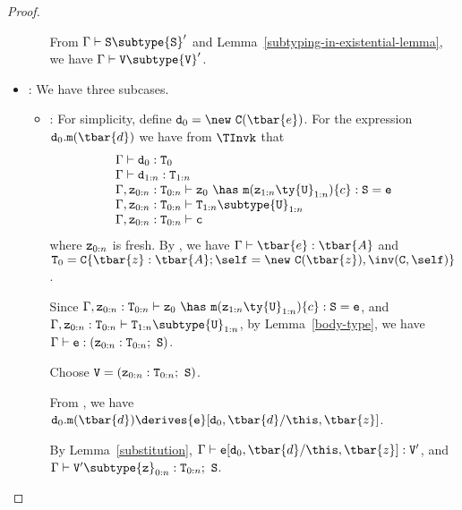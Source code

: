 \begin{proof}
\begin{itemize}
\begin{itemize}
{             From $\Gamma \vdash {\tt S} \subtype {\tt S}'$ and 
             Lemma~\ref{subtyping-in-existential-lemma}, we have $\Gamma \vdash {\tt V} \subtype {\tt V}'$.
             }
   \end{itemize}
\item
\TInvk: We have three subcases.
   \begin{itemize}
   \item
   \RInvk:  
            For simplicity, define ${\tt d}_0 = \new\ {\tt C}(\tbar{e})$.
            For the expression 
            ${\tt d}_0.{\tt m}(\tbar{d})$
            we have from $\TInvk$ that
            $$
            \begin{array}{l}
            \Gamma \vdash {\tt d}_0: {\tt T}_0 \\
            \Gamma \vdash {\tt d}_{1:n}: {\tt T}_{1:n} \\
            \Gamma, {\tt z}_{0:n}: {\tt T}_{0:n} \vdash
                {\tt z}_0\ \has\ {\tt m}({\tt z}_{1:n} \ty {\tt U}_{1:n})\{c\}: {\tt S} = {\tt e} \\
            \Gamma, {\tt z}_{0:n}: {\tt T}_{0:n} \vdash
                {\tt T}_{1:n} \subtype {\tt U}_{1:n} \\
            \Gamma, {\tt z}_{0:n}: {\tt T}_{0:n} \vdash
                {\tt c} \\
            \end{array}
            $$
            \noindent
            where ${\tt z}_{0:n}$ is fresh.  By \TNew, we have
            $\Gamma \vdash \tbar{e}: \tbar{A}$
            and
            ${\tt T}_0 = {\tt C}\{\tbar{z}: \tbar{A}; \self = \new\ {\tt C}(\tbar{z}), \inv({\tt C},\self)\}$.

            Since
            $\Gamma, {\tt z}_{0:n}: {\tt T}_{0:n} \vdash
                {\tt z}_0\ \has\ {\tt m}({\tt z}_{1:n} \ty {\tt U}_{1:n})\{c\}: {\tt S} = {\tt e}$,
            and 
            $\Gamma, {\tt z}_{0:n}: {\tt T}_{0:n} \vdash
                {\tt T}_{1:n} \subtype {\tt U}_{1:n}$,
            by Lemma~\ref{body-type}, we have
            $\Gamma \vdash {\tt e}: ({\tt z}_{0:n}: {\tt T}_{0:n};\ {\tt S})$.

            Choose ${\tt V} = ({\tt z}_{0:n}: {\tt T}_{0:n};\ {\tt S})$.

            From \RInvk, we have
            ${\tt d}_0.{\tt m}(\tbar{d}) \derives {\tt e}[{\tt d}_0,\tbar{d}/\this,\tbar{z}]$.

            By Lemma~\ref{substitution},
            $\Gamma \vdash {\tt e}[{\tt d}_0,\tbar{d}/\this,\tbar{z}] : {\tt V}'$,
            and
            $\Gamma \vdash {\tt V}' \subtype {\tt z}_{0:n} : {\tt T}_{0:n}{\tt ;\ S}$.


\end{itemize}
\end{itemize}
\end{proof}
